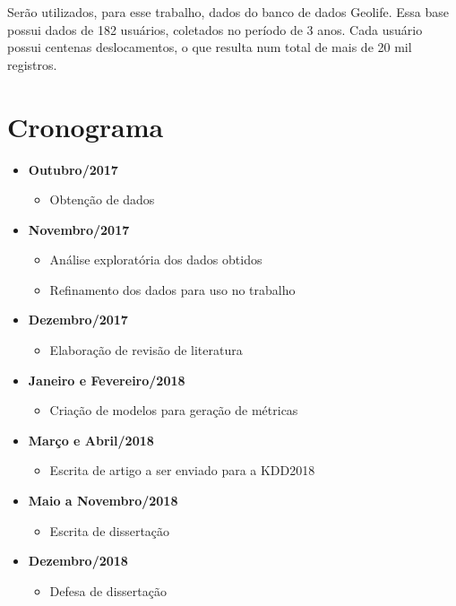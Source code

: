 \documentclass[ppgc,pep]{iiufrgs}
\begin{document}
Serão utilizados, para esse trabalho, dados do banco de dados Geolife. Essa base possui dados de 182 usuários, coletados
no período de 3 anos. Cada usuário possui centenas deslocamentos, o que resulta num total de mais de 20 mil registros.

\section{Cronograma}

\begin{itemize}
	\item \textbf{Outubro/2017}
	\begin{itemize}
		\item Obtenção de dados
	\end{itemize}
	\item \textbf{Novembro/2017}
	\begin{itemize}
		\item Análise exploratória dos dados obtidos
		\item Refinamento dos dados para uso no trabalho
	\end{itemize}
	\item \textbf{Dezembro/2017}
	\begin{itemize}
		\item Elaboração de revisão de literatura
	\end{itemize}
	\item \textbf{Janeiro e Fevereiro/2018}
	\begin{itemize}
		\item Criação de modelos para geração de métricas
	\end{itemize}
	\item \textbf{Março e Abril/2018}
	\begin{itemize}
		\item Escrita de artigo a ser enviado para a KDD2018
	\end{itemize}
	\item \textbf{Maio a Novembro/2018}
	\begin{itemize}
		\item Escrita de dissertação
	\end{itemize}
	\item \textbf{Dezembro/2018}
	\begin{itemize}
		\item Defesa de dissertação
	\end{itemize}
\end{itemize}
\end{document}
